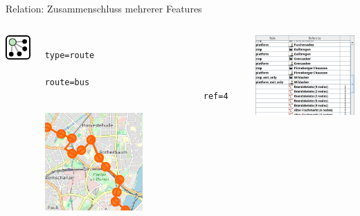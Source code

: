 \documentclass{beamer}
\begin{document}
			\begin{frame}[fragile]{Relation: Zusammenschluss mehrerer Features}
				\begin{center}
					\begin{columns}
						\begin{column}{1.25cm}
							\centering
							\includegraphics[width=1cm]{images/240px-Mf_relation.png}
						\end{column}
						\begin{column}{4cm}
							\begin{verbatim}
								type=route
								route=bus
								ref=4
							\end{verbatim}
							\vspace{0.25cm}
							\includegraphics[width=3.75cm]{images/relation-example.png}
						\end{column}
						\begin{column}{4cm}
							\includegraphics[width=4cm]{images/relation-list.png}
						\end{column}
					\end{columns}
				\end{center}
			\end{frame}
			
\end{document}
